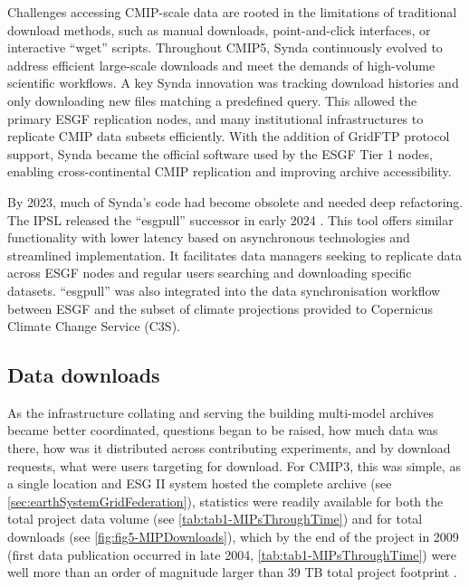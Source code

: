 \documentclass[manuscript]{copernicus}
\def\cred#1{{\color{red}#1}}
\begin{document}
Challenges accessing CMIP-scale data are rooted in the limitations of traditional download methods, such as manual downloads, point-and-click interfaces, or interactive ``wget'' scripts. Throughout CMIP5, Synda continuously evolved to address efficient large-scale downloads and meet the demands of high-volume scientific workflows. A key Synda innovation was tracking download histories and only downloading new files matching a predefined query. This allowed the primary ESGF replication nodes, and many institutional infrastructures to replicate CMIP data subsets efficiently. With the addition of GridFTP protocol support, Synda became the official software used by the ESGF Tier 1 nodes, enabling cross-continental CMIP replication and improving archive accessibility.

By 2023, much of Synda’s code had become obsolete and needed deep refactoring. The IPSL released the ``esgpull'' successor in early 2024 \citep{rodriguez_esgf_2024}. This tool offers similar functionality with lower latency based on asynchronous technologies and streamlined implementation. It facilitates data managers seeking to replicate data across ESGF nodes and regular users searching and downloading specific datasets. ``esgpull'' was also integrated into the data synchronisation workflow between ESGF and the subset of climate projections provided to Copernicus Climate Change Service (C3S).


\subsection{Data downloads}
\label{sec:CMIPDataDownloads}

As the infrastructure collating and serving the building multi-model archives became better coordinated, questions began to be raised, how much data was there, how was it distributed across contributing experiments, and by download requests, what were users targeting for download. For CMIP3, this was simple, as a single location and ESG II system hosted the complete archive (see \autoref{sec:earthSystemGridFederation}), statistics were readily available for both the total project data volume (see \autoref{tab:tab1-MIPsThroughTime}) and for total downloads (see \autoref{fig:fig5-MIPDownloads}), which by the end of the project in 2009 (first data publication occurred in late 2004, \autoref{tab:tab1-MIPsThroughTime}) were well more than an order of magnitude larger than 39 TB total project footprint \citep[470 TB;][]{ananthakrishnan_building_2007,williams_earth_2009}.
\end{document}
